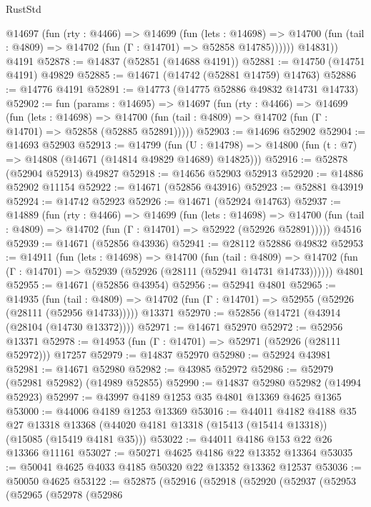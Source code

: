 \begin{lexlean}{RustStd}
\begin{coremodule}
          @14697
            (fun (rty : @4466) =>
            @14699
              (fun (lets : @14698) =>
              @14700 (fun (tail : @4809) => @14702 (fun (Γ : @14701) => @52858 @14785))))))
        @14831))
    @4191
@52878 := @14837 (@52851 (@14688 @4191))
@52881 := @14750 (@14751 @4191) @49829
@52885 := @14671 (@14742 (@52881 @14759) @14763)
@52886 := @14776 @4191
@52891 := @14773 (@14775 @52886 @49832 @14731 @14733)
@52902 := fun (params : @14695) =>
  @14697
    (fun (rty : @4466) =>
    @14699
      (fun (lets : @14698) =>
      @14700 (fun (tail : @4809) => @14702 (fun (Γ : @14701) => @52858 (@52885 @52891)))))
@52903 := @14696 @52902
@52904 := @14693 @52903
@52913 := @14799
    (fun (U : @14798) => @14800 (fun (t : @7) => @14808 (@14671 (@14814 @49829 @14689) @14825)))
@52916 := @52878 (@52904 @52913) @49827
@52918 := @14656 @52903 @52913
@52920 := @14886 @52902 @11154
@52922 := @14671 (@52856 @43916)
@52923 := @52881 @43919
@52924 := @14742 @52923
@52926 := @14671 (@52924 @14763)
@52937 := @14889
    (fun (rty : @4466) =>
    @14699
      (fun (lets : @14698) =>
      @14700 (fun (tail : @4809) => @14702 (fun (Γ : @14701) => @52922 (@52926 @52891)))))
    @4516
@52939 := @14671 (@52856 @43936)
@52941 := @28112 @52886 @49832
@52953 := @14911
    (fun (lets : @14698) =>
    @14700
      (fun (tail : @4809) =>
      @14702 (fun (Γ : @14701) => @52939 (@52926 (@28111 (@52941 @14731 @14733))))))
    @4801
@52955 := @14671 (@52856 @43954)
@52956 := @52941 @4801
@52965 := @14935
    (fun (tail : @4809) => @14702 (fun (Γ : @14701) => @52955 (@52926 (@28111 (@52956 @14733)))))
    @13371
@52970 := @52856 (@14721 (@43914 (@28104 (@14730 @13372))))
@52971 := @14671 @52970
@52972 := @52956 @13371
@52978 := @14953 (fun (Γ : @14701) => @52971 (@52926 (@28111 @52972))) @17257
@52979 := @14837 @52970
@52980 := @52924 @43981
@52981 := @14671 @52980
@52982 := @43985 @52972
@52986 := @52979 (@52981 @52982) (@14989 @52855)
@52990 := @14837 @52980 @52982 (@14994 @52923)
@52997 := @43997 @4189 @1253 @35 @4801 @13369 @4625 @1365
@53000 := @44006 @4189 @1253 @13369
@53016 := @44011
    @4182
    @4188
    @35
    @27
    @13318
    @13368
    (@44020 @4181 @13318 (@15413 (@15414 @13318)) (@15085 (@15419 @4181 @35)))
@53022 := @44011 @4186 @153 @22 @26 @13366 @11161
@53027 := @50271 @4625 @4186 @22 @13352 @13364
@53035 := @50041 @4625 @4033 @4185 @50320 @22 @13352 @13362 @12537
@53036 := @50050 @4625
@53122 := @52875
    (@52916
      (@52918
        (@52920
          (@52937
            (@52953
              (@52965
                (@52978
                  (@52986

\end{coremodule}
\end{lexlean}
